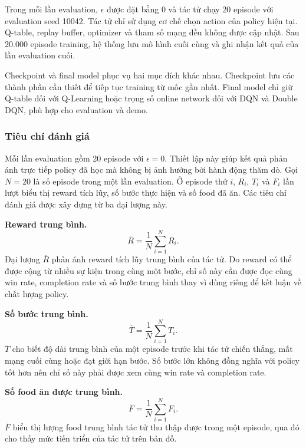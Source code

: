 Trong mỗi lần evaluation, $\epsilon$ được đặt bằng $0$ và tác tử chạy 20 episode với evaluation seed 10042. Tác tử chỉ sử dụng cơ chế chọn action của policy hiện tại. Q-table, replay buffer, optimizer và tham số mạng đều không được cập nhật. Sau 20.000 episode training, hệ thống lưu mô hình cuối cùng và ghi nhận kết quả của lần evaluation cuối.

Checkpoint và final model phục vụ hai mục đích khác nhau. Checkpoint lưu các thành phần cần thiết để tiếp tục training từ mốc gần nhất. Final model chỉ giữ Q-table đối với Q-Learning hoặc trọng số online network đối với DQN và Double DQN, phù hợp cho evaluation và demo.

\subsubsection{Tiêu chí đánh giá}

Mỗi lần evaluation gồm 20 episode với $\epsilon=0$. Thiết lập này giúp kết quả phản ánh trực tiếp policy đã học mà không bị ảnh hưởng bởi hành động thăm dò. Gọi $N=20$ là số episode trong một lần evaluation. Ở episode thứ $i$, $R_i$, $T_i$ và $F_i$ lần lượt biểu thị reward tích lũy, số bước thực hiện và số food đã ăn. Các tiêu chí đánh giá được xây dựng từ ba đại lượng này.

\noindent\textbf{Reward trung bình.}
\begin{equation}
    \overline{R}=\frac{1}{N}\sum_{i=1}^{N}R_i.
    \label{eq:average-reward}
\end{equation}
Đại lượng $\overline{R}$ phản ánh reward tích lũy trung bình của tác tử. Do reward có thể được cộng từ nhiều sự kiện trong cùng một bước, chỉ số này cần được đọc cùng win rate, completion rate và số bước trung bình thay vì dùng riêng để kết luận về chất lượng policy.

\noindent\textbf{Số bước trung bình.}
\begin{equation}
    \overline{T}=\frac{1}{N}\sum_{i=1}^{N}T_i.
    \label{eq:average-steps}
\end{equation}
$\overline{T}$ cho biết độ dài trung bình của một episode trước khi tác tử chiến thắng, mất mạng cuối cùng hoặc đạt giới hạn bước. Số bước lớn không đồng nghĩa với policy tốt hơn nên chỉ số này phải được xem cùng win rate và completion rate.

\noindent\textbf{Số food ăn được trung bình.}
\begin{equation}
    \overline{F}=\frac{1}{N}\sum_{i=1}^{N}F_i.
    \label{eq:average-food}
\end{equation}
$\overline{F}$ biểu thị lượng food trung bình tác tử thu thập được trong một episode, qua đó cho thấy mức tiến triển của tác tử trên bản đồ.

